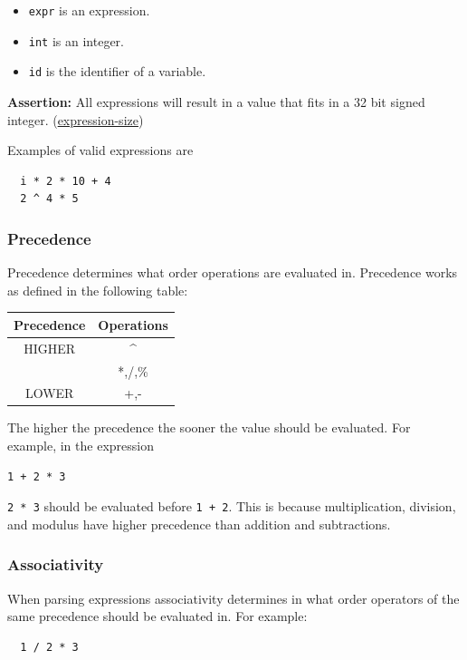 \documentclass{article}
\newcommand{\code}[1]{\texttt{\textmd{#1}}}
\newcommand{\assertion}[2]{\textbf{Assertion: }#1 (\hyperlink{#2}{#2})}
\begin{document}
\begin{itemize}
  \item \code{expr} is an expression.
  \item \code{int} is an integer.
  \item \code{id} is the identifier of a variable.
\end{itemize}

\assertion{All expressions will result in a value that fits in a 32 bit signed integer.}
{expression-size}

Examples of valid expressions are
\begin{lstlisting}
  i * 2 * 10 + 4
  2 ^ 4 * 5
\end{lstlisting}

\subsubsection{Precedence}
Precedence determines what order operations are evaluated in. Precedence works as defined in the
following table:
\begin{center}
  \begin{tabular}{|c|c|}
    \hline
    \textbf{Precedence} & \textbf{Operations} \\
    \hline
    HIGHER & \textasciicircum \\
           & *,/,\% \\
    LOWER  & +,- \\
    \hline
  \end{tabular}
\end{center}

The higher the precedence the sooner the value should be evaluated. For example, in the expression
\begin{lstlisting}
1 + 2 * 3
\end{lstlisting}
\code{2 * 3} should be evaluated before \code{1 + 2}. This is because multiplication, division, and modulus
have higher precedence than addition and subtractions.

\subsubsection{Associativity}
When parsing expressions associativity determines in what order operators of the same precedence
should be evaluated in. For example:
\begin{lstlisting}
  1 / 2 * 3
\end{lstlisting}
\end{document}
